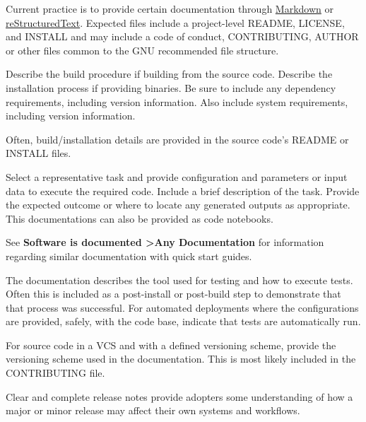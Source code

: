 \documentclass{article}
\newcounter{subsubsubsection}[subsubsection]
\begin{document}
Current practice is to provide certain documentation through \href{https://daringfireball.net/projects/markdown/} {Markdown} or \href{http://docutils.sourceforge.net/rst.html} {reStructuredText}. Expected files include a project-level README, LICENSE, and INSTALL and may include a code of conduct, CONTRIBUTING, AUTHOR or other files common to the GNU recommended file structure. 

Describe the build procedure if building from the source code. Describe the installation process if providing binaries. Be sure to include any dependency requirements, including version information. Also include system requirements, including version information.
 
Often, build/installation details are provided in the source code’s README or INSTALL files. 

Select a representative task and provide configuration and parameters or input data to execute the required code. Include a brief description of the task. Provide the expected outcome or where to locate any generated outputs as appropriate. This documentations can also be provided as code notebooks.
 
See \textbf{Software is documented \textgreater Any Documentation} for information regarding similar documentation with quick start guides.

The documentation describes the tool used for testing and how to execute tests. Often this is included as a post-install or post-build step to demonstrate that that process was successful. For automated deployments where the configurations are provided, safely, with the code base, indicate that tests are automatically run.

For source code in a VCS and with a defined versioning scheme, provide the versioning scheme used in the documentation. This is most likely included in the CONTRIBUTING file.

Clear and complete release notes provide adopters some understanding of how a major or minor release may affect their own systems and workflows. 
 
\end{document}
